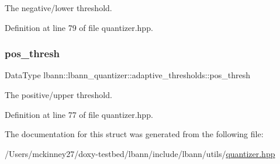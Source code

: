 The negative/lower threshold. 

Definition at line 79 of file quantizer.\+hpp.

\mbox{\label{structlbann_1_1lbann__quantizer_1_1adaptive__thresholds_a6f6aee51ed629c2ab68666d577189bb9}} 
\subsubsection{\texorpdfstring{pos\+\_\+thresh}{pos\_thresh}}
{\footnotesize\ttfamily Data\+Type lbann\+::lbann\+\_\+quantizer\+::adaptive\+\_\+thresholds\+::pos\+\_\+thresh}

The positive/upper threshold. 

Definition at line 77 of file quantizer.\+hpp.



The documentation for this struct was generated from the following file\+:\begin{DoxyCompactItemize}
\item 
/\+Users/mckinney27/doxy-\/testbed/lbann/include/lbann/utils/\hyperlink{quantizer_8hpp}{quantizer.\+hpp}\end{DoxyCompactItemize}
